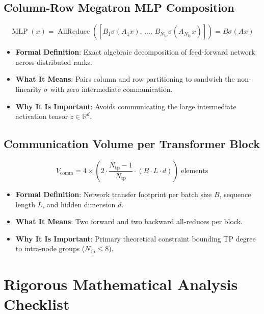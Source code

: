 \documentclass[11pt,a4paper]{article}
\theoremstyle{definition}
\begin{document}
\subsection{Column-Row Megatron MLP Composition}
{\boldmath
\begin{equation}
\operatorname{MLP}(x) = \operatorname{AllReduce}\left( \left[ B_1 \sigma(A_1 x), \, \dots, \, B_{N_{\text{tp}}} \sigma(A_{N_{\text{tp}}} x) \right] \right) = B \sigma(A x)
\end{equation}
}
\begin{itemize}
    \item \textbf{Formal Definition}: Exact algebraic decomposition of feed-forward network across distributed ranks.
    \item \textbf{What It Means}: Pairs column and row partitioning to sandwich the non-linearity $\sigma$ with zero intermediate communication.
    \item \textbf{Why It Is Important}: Avoids communicating the large intermediate activation tensor $z \in \mathbb{R}^d$.
\end{itemize}

\subsection{Communication Volume per Transformer Block}
{\boldmath
\begin{equation}
V_{\text{comm}} = 4 \times \left( 2 \cdot \frac{N_{\text{tp}} - 1}{N_{\text{tp}}} \cdot (B \cdot L \cdot d) \right) \text{ elements}
\end{equation}
}
\begin{itemize}
    \item \textbf{Formal Definition}: Network transfer footprint per batch size $B$, sequence length $L$, and hidden dimension $d$.
    \item \textbf{What It Means}: Two forward and two backward all-reduces per block.
    \item \textbf{Why It Is Important}: Primary theoretical constraint bounding TP degree to intra-node groups ($N_{\text{tp}} \le 8$).
\end{itemize}

\section{Rigorous Mathematical Analysis Checklist}
\end{document}
